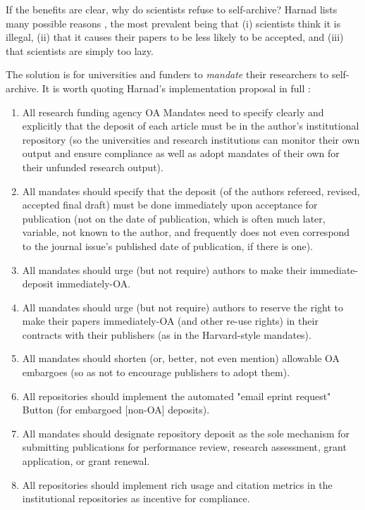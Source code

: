 \documentclass[11pt, openany, oneside, article, a4paper, twocolumn]{memoir}
\begin{document}
If the benefits are clear, why do scientists refuse to self-archive?
Harnad lists many possible reasons \cite{harnad2006opening}, the most
prevalent being that (i) scientists think it is illegal, (ii) that it
causes their papers to be less likely to be accepted, and (iii) that
scientists are simply too lazy.

The solution is for universities and funders to \emph{mandate} their
researchers to self-archive. It is worth quoting Harnad's implementation proposal in full \cite{harnad2015openwhat}:

\begin{small}
\begin{enumerate}[(1)]
\item All research funding agency OA Mandates need to specify clearly and explicitly that the deposit of each
article must be in the author’s institutional repository (so the universities
and research institutions can monitor their own output and ensure compliance as
well as adopt mandates of their own for their unfunded research output).

\item All mandates should specify that the deposit (of the authors refereed, revised,
accepted final draft) must be done immediately upon acceptance for publication
(not on the date of publication, which is often much later, variable, not known
to the author, and frequently does not even correspond to the journal issue’s
published date of publication, if there is one).

\item All mandates should urge
(but not require) authors to make their immediate-deposit immediately-OA.
\item All mandates should urge (but not require) authors to reserve the right to make
their papers immediately-OA (and other re-use rights) in their contracts with
their publishers (as in the Harvard-style mandates).
\item All mandates should
shorten (or, better, not even mention) allowable OA embargoes (so as not to
encourage publishers to adopt them).
\item All repositories should implement the
automated "email eprint request" Button (for embargoed [non-OA] deposits).
\item All mandates should designate repository deposit as the sole mechanism for
submitting publications for performance review, research assessment, grant
application, or grant renewal.
\item All repositories should implement rich usage
and citation metrics in the institutional repositories as incentive for
compliance.
\end{enumerate}
\end{small}
\end{document}
